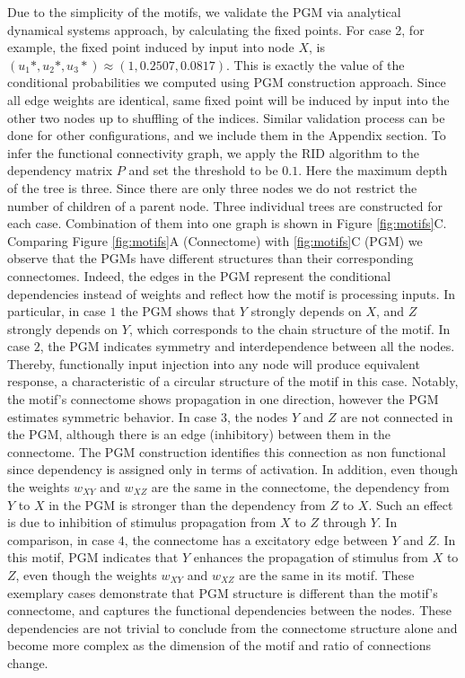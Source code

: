 \documentclass[letterpaper,11pt]{article}
\begin{document}
Due to the simplicity of the motifs, we validate the PGM via analytical dynamical systems approach, by calculating the fixed points. For case 2, for example, the fixed point induced by input into node $X$, is $(u_1*,u_2*,u_3*)\approx(1, 0.2507, 0.0817)$. This is exactly the value of the conditional probabilities we computed using  PGM construction approach.
Since all edge weights are identical, same fixed point will be induced by input into the other two nodes up to shuffling of the indices. Similar validation process can be done for other configurations, and we include them in the Appendix section. To infer the functional connectivity graph, we apply the RID algorithm to the dependency matrix $P$ and set the threshold to be $0.1$. Here the maximum depth of the tree is three. Since there are only three nodes we do not restrict the number of children of a parent node. Three individual trees are constructed for each case. Combination of them  into one graph is shown in Figure \ref{fig:motifs}C. Comparing Figure \ref{fig:motifs}A (Connectome) with \ref{fig:motifs}C (PGM) we observe that the PGMs have different structures than their corresponding connectomes. Indeed, the edges in the PGM represent the conditional dependencies instead of weights and reflect how the motif is processing inputs. In particular, in case $1$ the PGM shows that $Y$ strongly depends on $X$, and $Z$ strongly depends on $Y$, which corresponds to the chain structure of the motif. In case $2$, the PGM indicates symmetry and interdependence between all the nodes. Thereby, functionally input injection into any node will produce equivalent response, a characteristic of a circular structure of the motif in this case. Notably, the motif's connectome shows propagation in one direction, however the PGM estimates symmetric behavior. In case $3$, the nodes $Y$ and $Z$ are not connected in the PGM, although there is an edge (inhibitory) between them in the connectome. The PGM construction identifies this connection as non functional since dependency is assigned only in terms of activation. In addition, even though the weights $w_{XY}$ and $w_{XZ}$ are the same in the connectome,  the dependency from $Y$ to $X$ in the PGM is stronger than the dependency from $Z$ to $X$. Such an effect is due to inhibition of stimulus propagation from $X$ to $Z$ through $Y$. In comparison, in case $4$, the connectome has a excitatory edge between $Y$ and $Z$. In this motif, PGM indicates that $Y$ enhances the propagation of stimulus from $X$ to $Z$, even though the weights $w_{XY}$ and $w_{XZ}$ are the same in its motif. These exemplary cases demonstrate that PGM structure is different than the motif's connectome, and captures the functional dependencies between the nodes. These dependencies are not trivial to conclude from the connectome structure alone and become more complex as the dimension of the motif and ratio of connections change.
\end{document}
